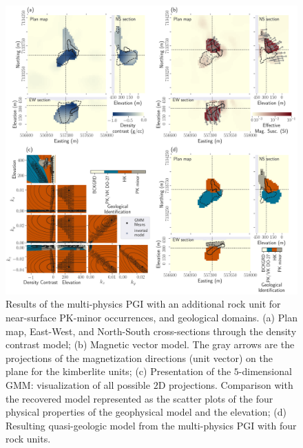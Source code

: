 \documentclass[paper, twocolumn]{geophysics} %
\begin{document}
\begin{figure}%
\centering
\includegraphics[width=\textwidth]{Figures/300dpi/Figure13.png}
\caption{Results of the multi-physics PGI with an additional rock unit for near-surface PK-minor occurrences, and geological domains. (a) Plan map, East-West, and North-South cross-sections through the density contrast model; (b) Magnetic vector model. The gray arrows are the projections of the magnetization directions (unit vector) on the plane for the kimberlite units; (c) Presentation of the $5$-dimensional GMM: visualization of all possible $2$D projections. Comparison with the recovered model represented as the scatter plots of the four physical properties of the geophysical model and the elevation; (d) Resulting quasi-geologic model from the multi-physics PGI with four rock units.}
\label{fig:Figure13.png}
\end{figure}%

\end{document}
